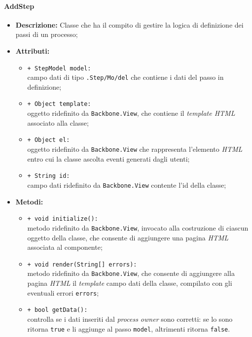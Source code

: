 \paragraph{AddStep}
\begin{flushleft}
\begin{itemize}
\item \textbf{Descrizione:} Classe che ha il compito di gestire la logica di definizione dei passi di un processo;
\item \textbf{Attributi:}
\begin{sloppypar}
\begin{itemize}
\item \texttt{+ StepModel model:}\\ campo dati di tipo \texttt{\model{}.Step\fshyp{}Mo\fshyp{}del} che contiene i dati del passo in definizione;
\item \texttt{+ Object template:}\\ oggetto ridefinito da \texttt{Backbone.View}, che contiene il \textit{template HTML} associato alla classe;
\item \texttt{+ Object el:}\\ oggetto ridefinito da \texttt{Backbone.View} che rappresenta l'elemento \textit{HTML} entro cui la classe ascolta eventi generati dagli utenti;
\item \texttt{+ String id:}\\ campo dati ridefinito da \texttt{Backbone.View} contente l'id della classe;
\end{itemize}
\end{sloppypar}
\item \textbf{Metodi:}
\begin{sloppypar}
\begin{itemize}
\item \texttt{+ void initialize():}\\ metodo ridefinito da \texttt{Backbone.View}, invocato alla costruzione di ciascun oggetto della classe, che consente di aggiungere una pagina \textit{HTML} associata al componente;
\item \texttt{+ void render(String[] errors):}\\ metodo ridefinito da \texttt{Backbone.View}, che consente di aggiungere alla pagina \textit{HTML} il \textit{template} campo dati della classe, compilato con gli eventuali errori \texttt{errors};
\item \texttt{+ bool getData():}\\ controlla se i dati inseriti dal \textit{process owner} sono corretti: se lo sono ritorna \texttt{true} e li aggiunge al passo \texttt{model}, altrimenti ritorna \texttt{false}.
\end{itemize}
\end{sloppypar}
\end{itemize}
\end{flushleft}

